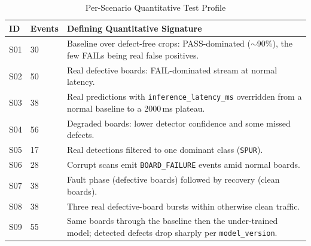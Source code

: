 \documentclass[12pt,a4paper]{article}
\begin{document}
\begin{table}[!ht]
\centering
\caption{Per-Scenario Quantitative Test Profile}
\label{tab:scenario_quantitative_profile}
\begin{tabular}{p{} p{} p{}}
\toprule
\textbf{ID} & \textbf{Events} & \textbf{Defining Quantitative Signature} \\
\midrule
S01 & 30 & Baseline over defect-free crops: PASS-dominated ($\sim$90\%), the few FAILs being real false positives. \\
S02 & 50 & Real defective boards: FAIL-dominated stream at normal latency. \\
S03 & 38 & Real predictions with \texttt{inference\_latency\_ms} overridden from a normal baseline to a 2000\,ms plateau. \\
S04 & 56 & Degraded boards: lower detector confidence and some missed defects. \\
S05 & 17 & Real detections filtered to one dominant class (\texttt{SPUR}). \\
S06 & 28 & Corrupt scans emit \texttt{BOARD\_FAILURE} events amid normal boards. \\
S07 & 38 & Fault phase (defective boards) followed by recovery (clean boards). \\
S08 & 38 & Three real defective-board bursts within otherwise clean traffic. \\
S09 & 55 & Same boards through the baseline then the under-trained model; detected defects drop sharply per \texttt{model\_version}. \\
\bottomrule
\end{tabular}
\end{table}
\end{document}
